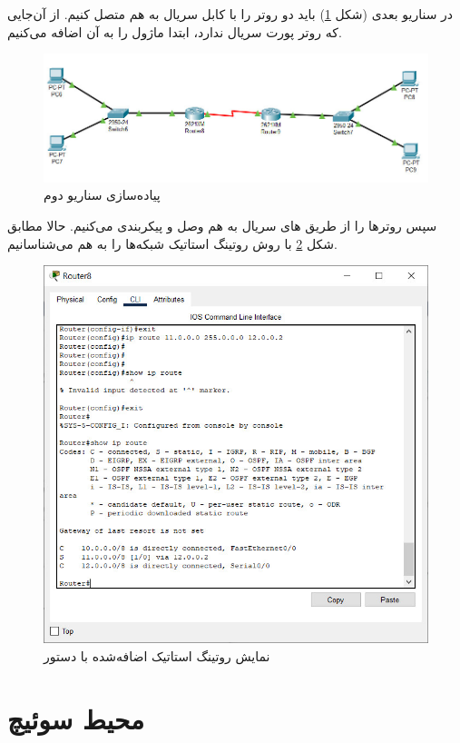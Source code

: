 \documentclass{article}
\newcommand{\code}[1]{\colorbox{codegray}{\texttt{#1}}}
\begin{document}
در سناریو بعدی (شکل \ref{fig:scenario-2}) باید دو روتر را با کابل سریال به هم متصل کنیم. از آن‌جایی که روتر  پورت سریال ندارد، ابتدا ماژول  را به آن اضافه می‌کنیم.
\begin{figure}[h!]
	\centering
	\includegraphics[width=0.6\columnwidth]{figs/scenario-2.jpg}
	\caption{پیاده‌سازی سناریو دوم}
	\label{fig:scenario-2}
\end{figure}

سپس روترها را از طریق های سریال به هم وصل و پیکربندی می‌کنیم. 
حالا مطابق شکل \ref{fig:serial-route} با روش روتینگ استاتیک شبکه‌ها را به هم می‌شناسانیم.

\begin{figure}[h!]
	\centering
	\includegraphics[width=0.6\columnwidth]{figs/serial-route.jpg}
	\caption{نمایش روتینگ استاتیک اضافه‌شده با دستور \code{}}
	\label{fig:serial-route}
\end{figure}


\section{محیط  سوئیچ}
\end{document}
